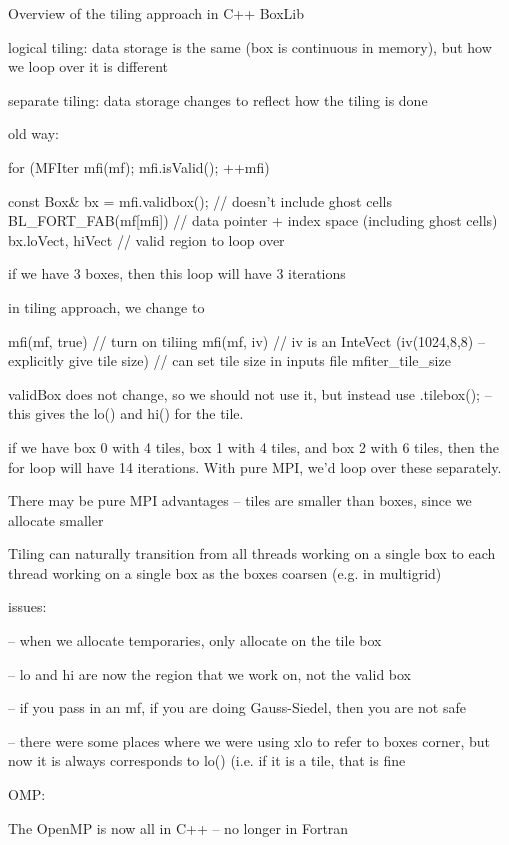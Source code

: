 Overview of the tiling approach in C++ BoxLib

logical tiling: data storage is the same (box is continuous in
memory), but how we loop over it is different

separate tiling: data storage changes to reflect how the tiling is done



old way:

for (MFIter mfi(mf); mfi.isValid(); ++mfi)
{

  const Box& bx = mfi.validbox();  // doesn't include ghost cells
  BL_FORT_FAB(mf[mfi])   // data pointer + index space (including ghost cells)
              bx.loVect, hiVect  // valid region to loop over
  
}


if we have 3 boxes, then this loop will have 3 iterations



in tiling approach, we change to

mfi(mf, true)   // turn on tiliing
mfi(mf, iv)     // iv is an InteVect (iv(1024,8,8) -- explicitly give tile size)
// can set tile size in inputs file  mfiter_tile_size

validBox does not change, so we should not use it, but instead use .tilebox(); -- this
gives the lo() and hi() for the tile.


if we have box 0 with 4 tiles, box 1 with 4 tiles, and box 2 with 6
tiles, then the for loop will have 14 iterations.  With pure MPI, we'd
loop over these separately.

There may be pure MPI advantages -- tiles are smaller than boxes,
since we allocate smaller 


Tiling can naturally transition from all threads working on a single box to
each thread working on a single box as the boxes coarsen (e.g. in multigrid)


issues:

-- when we allocate temporaries, only allocate on the tile box

-- lo and hi are now the region that we work on, not the valid box
   
-- if you pass in an mf, if you are doing Gauss-Siedel, then you are
   not safe

-- there were some places where we were using xlo to refer to boxes
   corner, but now it is always corresponds to lo() (i.e. if it is a
   tile, that is fine


OMP:

The OpenMP is now all in C++ -- no longer in Fortran


